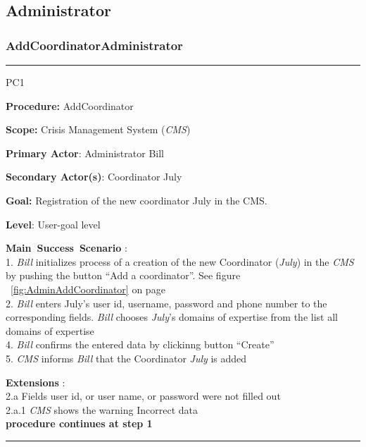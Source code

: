 \subsection{Administrator}

\subsubsection{AddCoordinatorAdministrator}

\vspace{0.5cm}
\hrule
\begin{lyxlist}{PC1}
\small{
\item [\textbf{Procedure:}] AddCoordinator
\item [\textbf{Scope:}] Crisis Management System (\emph{CMS})
\item [\textbf{Primary Actor}:] Administrator Bill
\item [\textbf{Secondary Actor(s)}:] Coordinator July
\item [\textbf{Goal:}] Registration of the new coordinator July in the CMS.
\item [\textbf{Level}:] User-goal level
\item [\textbf{Main~Success~Scenario}]:\\
1. \emph{Bill} initializes process of a creation of the new Coordinator
(\emph{July}) in the \emph{CMS} by pushing the button ``Add a coordinator''. See
figure ~\ref{fig:AdminAddCoordinator} on page~\pageref{fig:AdminAddCoordinator}\\
2. \emph{Bill} enters July's user id, username, password and phone number to the
corresponding fields. \emph{Bill} chooses \emph{July}'s domains of expertise
from the list all domains of expertise\\
4. \emph{Bill} confirms the entered data by clickinng button ``Create''\\
5. \emph{CMS} informs \emph{Bill} that the Coordinator \emph{July} is added

\item [\textbf{Extensions}]:\\
2.a Fields user id, or user name, or password were not filled out\\
\hspace*{0.5cm} 2.a.1 \emph{CMS} shows the warning Incorrect data\\
\hspace*{0.5cm} \textbf{procedure continues at step 1}

}
\end{lyxlist}
\hrule
\vspace{0.5cm}


